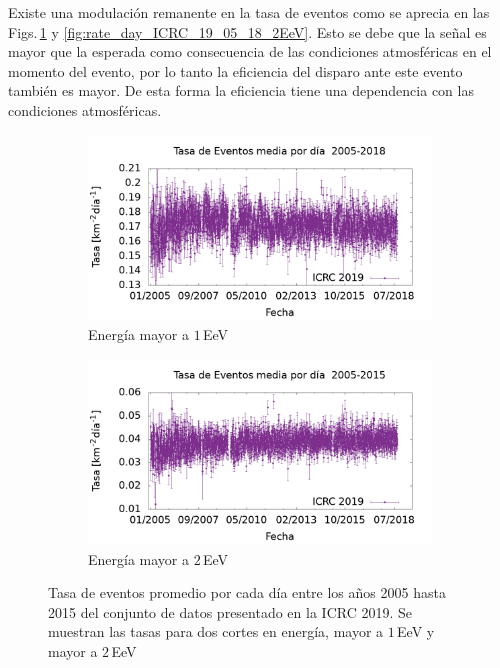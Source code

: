 				Existe una modulación remanente en la tasa de eventos como se aprecia en las Figs.\,\ref{fig:rate_day_ICRC_19_05_18} y \ref{fig:rate_day_ICRC_19_05_18_2EeV}. Esto se debe que la señal es mayor que la esperada como consecuencia de las condiciones atmosféricas en el momento del evento, por lo tanto la eficiencia del disparo ante este evento también es mayor. De esta forma la eficiencia tiene una dependencia con las condiciones atmosféricas.
			\begin{figure}[H]
    			\begin{subfigure}[b]{0.5\textwidth}
				\includegraphics[width=\textwidth]{Graphs/rate_dayly/1EeV_ICRC_2019_05_18.png}
				\caption{Energía mayor a $1\,$EeV}
				\label{fig:rate_day_ICRC_19_05_18}
    			\end{subfigure}%
    			\hspace{\fill}
    			\begin{subfigure}[b]{0.5\textwidth}
				\includegraphics[width=\textwidth]{Graphs/rate_dayly/2EeV_ICRC_2019_05_19.png}
				\caption{ Energía mayor a $2\,$EeV}
				\label{fig:rate_2015_ICRC_19_05_18}
    			\end{subfigure}%
    			\caption{Tasa de eventos promedio por cada día entre los años 2005 hasta 2015 del conjunto de datos presentado en la ICRC 2019. Se muestran las tasas para dos cortes en energía, mayor a $1\,$EeV y mayor a $2\,$EeV}\label{fig:rate_new_18}
			\end{figure}
